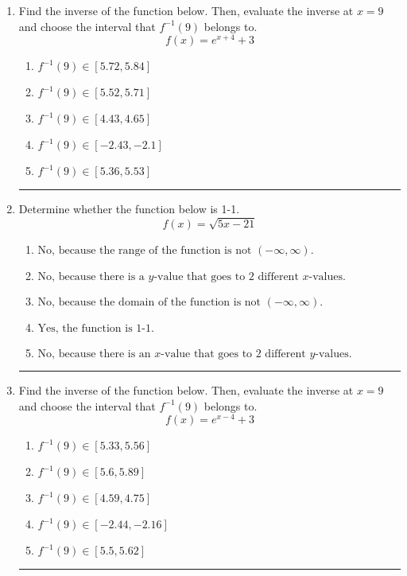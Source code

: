 \documentclass[14pt]{extbook}
\newcommand{\litem}[1]{\item#1\hspace*{-1cm}\rule{\textwidth}{0.4pt}}
\begin{document}
\begin{enumerate}
{\begin{enumerate}[label=\Alph*.]
\end{enumerate} }
\litem{
Find the inverse of the function below. Then, evaluate the inverse at $x = 9$ and choose the interval that $f^{-1}(9)$ belongs to.\[ f(x) = e^{x+4}+3 \]\begin{enumerate}[label=\Alph*.]
\item \( f^{-1}(9) \in [5.72, 5.84] \)
\item \( f^{-1}(9) \in [5.52, 5.71] \)
\item \( f^{-1}(9) \in [4.43, 4.65] \)
\item \( f^{-1}(9) \in [-2.43, -2.1] \)
\item \( f^{-1}(9) \in [5.36, 5.53] \)

\end{enumerate} }
\litem{
Determine whether the function below is 1-1.\[ f(x) = \sqrt{5 x - 21} \]\begin{enumerate}[label=\Alph*.]
\item \( \text{No, because the range of the function is not $(-\infty, \infty)$.} \)
\item \( \text{No, because there is a $y$-value that goes to 2 different $x$-values.} \)
\item \( \text{No, because the domain of the function is not $(-\infty, \infty)$.} \)
\item \( \text{Yes, the function is 1-1.} \)
\item \( \text{No, because there is an $x$-value that goes to 2 different $y$-values.} \)

\end{enumerate} }
\litem{
Find the inverse of the function below. Then, evaluate the inverse at $x = 9$ and choose the interval that $f^{-1}(9)$ belongs to.\[ f(x) = e^{x-4}+3 \]\begin{enumerate}[label=\Alph*.]
\item \( f^{-1}(9) \in [5.33, 5.56] \)
\item \( f^{-1}(9) \in [5.6, 5.89] \)
\item \( f^{-1}(9) \in [4.59, 4.75] \)
\item \( f^{-1}(9) \in [-2.44, -2.16] \)
\item \( f^{-1}(9) \in [5.5, 5.62] \)

\end{enumerate} }
\end{enumerate}
\end{document}
